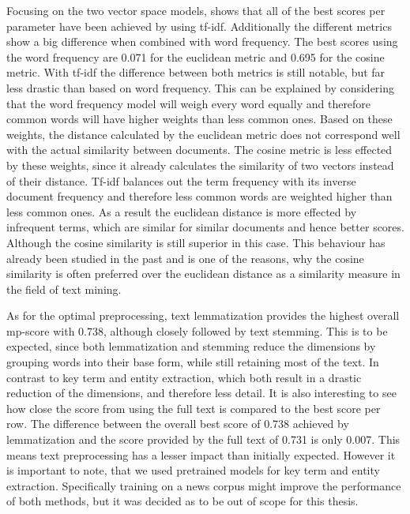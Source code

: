 Focusing on the two vector space models, shows that all of the best scores per parameter have been achieved by using tf-idf.
Additionally the different metrics show a big difference when combined with word frequency.
The best scores using the word frequency are 0.071 for the euclidean metric and 0.695 for the cosine metric.
With tf-idf the difference between both metrics is still notable, but far less drastic than based on word frequency.
This can be explained by considering that the word frequency model will weigh every word equally
and therefore common words will have higher weights than less common ones.
Based on these weights, the distance calculated by the euclidean metric does not correspond well with the actual similarity between documents.
The cosine metric is less effected by these weights,
since it already calculates the similarity of two vectors instead of their distance.
Tf-idf balances out the term frequency  with its inverse document frequency
and therefore less common words are weighted higher than less common ones.
As a result the euclidean distance is more effected by infrequent terms,
which are similar for similar documents and hence better scores.
Although the cosine similarity is still superior in this case.
This behaviour has already been studied in the past\cite{Strehl00impactof}\cite{similarity_measures}
and is one of the reasons, why the cosine similarity is often preferred over the euclidean distance as a similarity measure in the field of text mining.

As for the optimal preprocessing, text lemmatization provides the highest overall mp-score with 0.738,
although closely followed by text stemming.
This is to be expected, since both lemmatization and stemming reduce the dimensions by grouping words into their base form,
while still retaining most of the text.
In contrast to key term and entity extraction, which both result in a drastic reduction of the dimensions, and therefore less detail.
It is also interesting to see how close the score from using the full text is compared to the best score per row.
The difference between the overall best score of 0.738 achieved by lemmatization and the score provided by the full text of 0.731 is only 0.007.
This means text preprocessing has a lesser impact than initially expected.
However it is important to note, that we used pretrained models for key term and entity extraction.
Specifically training on a news corpus might improve the performance of both methods, but it was decided as to be out of scope for this thesis.

